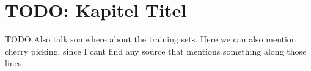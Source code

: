 \chapter{TODO: Kapitel Titel}
TODO Also talk somwhere about the training sets. Here we can also mention cherry picking, since I cant find any source that mentions something along those lines.





\iffalse
@Diskussion:
- Hirachischer Baum
     => Feature besser nutzen, um einzlene sub feature zu generieren
- Feature kann man leicher abändern um invarianzen hinzuzufügen, e.g. normalisierung
\fi